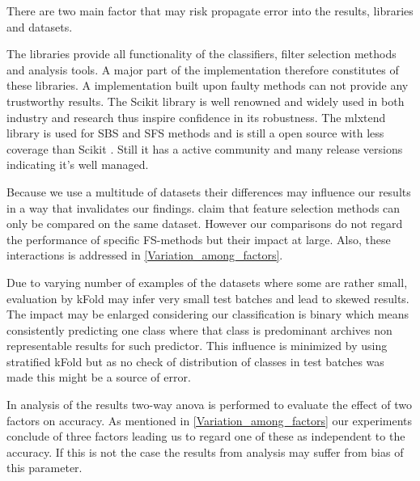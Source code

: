 There are two main factor that may risk propagate error into the results, libraries and datasets.

The libraries provide all functionality of the classifiers, filter selection methods and analysis tools. A major part of the implementation therefore constitutes of these libraries. A implementation built upon faulty methods can not provide any trustworthy results. The Scikit library \parencite{scikit-learn} is well renowned and widely used in both industry and research thus inspire confidence in its robustness. The mlxtend library is used for SBS and SFS methods and is still a open source with less coverage than Scikit \parencite{mlextend}. Still it has a active community and many release versions indicating it's well managed.

Because we use a multitude of datasets their differences may influence our results in a way that invalidates our findings. \textcite{c201416} claim that feature selection methods can only be compared on the same dataset. However our comparisons do not regard the performance of specific FS-methods but their impact at large. Also, these interactions is addressed in \ref{Variation_among_factors}.

Due to varying number of examples of the datasets where some are rather small, evaluation by kFold may infer very small test batches and lead to skewed results. The impact may be enlarged considering our classification is binary which means consistently predicting one class where that class is predominant archives non representable results for such predictor. This influence is minimized by using stratified kFold but as no check of distribution of classes in test batches was made this might be a source of error.

In analysis of the results two-way anova is performed to evaluate the effect of two factors on accuracy. As mentioned in \ref{Variation_among_factors} our experiments conclude of three factors leading us to regard one of these as independent to the accuracy. If this is not the case the results from analysis may suffer from bias of this parameter.
